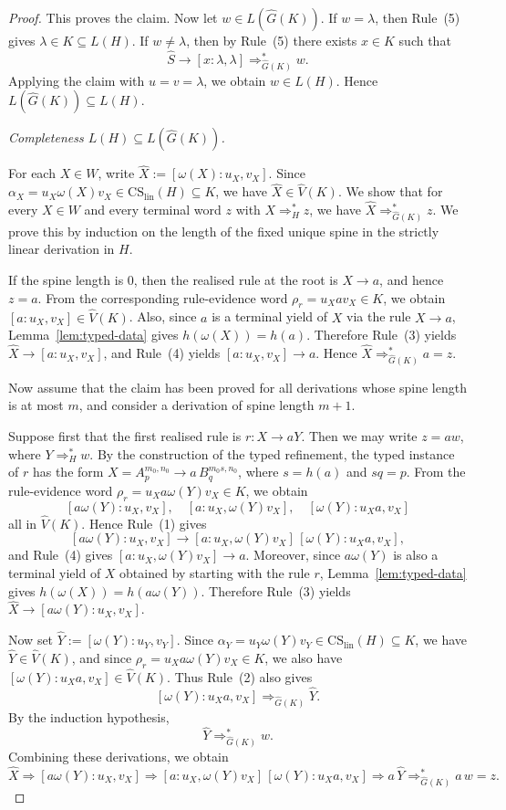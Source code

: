\documentclass[11pt,a4paper]{article}
\newcommand{\CS}{\mathrm{CS}}
\newcommand{\lin}{\mathrm{lin}}
\begin{document}
\begin{proof}
This proves the claim.
Now let $w\in L(\hat G(K))$.
If $w=\lambda$, then Rule~\textup{(5)} gives
$\lambda\in K\subseteq L(H)$.
If $w\neq\lambda$, then by Rule~\textup{(5)} there exists $x\in K$ such that
\[
\hat S\to[x:\lambda,\lambda]\Rightarrow_{\hat G(K)}^* w.
\]
Applying the claim with $u=v=\lambda$, we obtain $w\in L(H)$.
Hence $L(\hat G(K))\subseteq L(H)$.

\medskip
\noindent\emph{Completeness $L(H)\subseteq L(\hat G(K))$.}

For each $X\in W$, write $\widehat X:=[\omega(X):u_X,v_X]$.
Since $\alpha_X=u_X\omega(X)v_X\in \CS_{\lin}(H)\subseteq K$,
we have $\widehat X\in \hat V(K)$.
We show that for every $X\in W$ and every terminal word $z$ with
$X\Rightarrow_H^* z$, we have
$\widehat X\Rightarrow_{\hat G(K)}^* z$.
We prove this by induction on the length of the fixed unique spine in the
strictly linear derivation in $H$.

If the spine length is $0$, then the realised rule at the root is
$X\to a$, and hence $z=a$.
From the corresponding rule-evidence word $\rho_r=u_Xav_X\in K$,
we obtain $[a:u_X,v_X]\in \hat V(K)$.
Also, since $a$ is a terminal yield of $X$ via the rule $X\to a$,
Lemma~\ref{lem:typed-data} gives $h(\omega(X))=h(a)$.
Therefore Rule~\textup{(3)} yields
$\widehat X\to[a:u_X,v_X]$,
and Rule~\textup{(4)} yields
$[a:u_X,v_X]\to a$.
Hence $\widehat X\Rightarrow_{\hat G(K)}^* a=z$.

Now assume that the claim has been proved for all derivations whose spine
length is at most $m$, and consider a derivation of spine length $m+1$.

Suppose first that the first realised rule is $r:X\to aY$.
Then we may write $z=aw$, where $Y\Rightarrow_H^* w$.
By the construction of the typed refinement, the typed instance of $r$ has
the form
$X=A_p^{m_0,n_0}\to a\,B_q^{m_0s,n_0}$,
where $s=h(a)$ and $sq=p$.
From the rule-evidence word
$\rho_r=u_Xa\omega(Y)v_X\in K$, we obtain
\[
[a\omega(Y):u_X,v_X],\quad
[a:u_X,\omega(Y)v_X],\quad
[\omega(Y):u_Xa,v_X]
\]
all in $\hat V(K)$.
Hence Rule~\textup{(1)} gives
\[
[a\omega(Y):u_X,v_X]\to
[a:u_X,\omega(Y)v_X]\,[\omega(Y):u_Xa,v_X],
\]
and Rule~\textup{(4)} gives
$[a:u_X,\omega(Y)v_X]\to a$.
Moreover, since $a\omega(Y)$ is also a terminal yield of $X$ obtained by
starting with the rule $r$, Lemma~\ref{lem:typed-data} gives
$h(\omega(X))=h(a\omega(Y))$.
Therefore Rule~\textup{(3)} yields
$\widehat X\to[a\omega(Y):u_X,v_X]$.

Now set $\widehat Y:=[\omega(Y):u_Y,v_Y]$.
Since $\alpha_Y=u_Y\omega(Y)v_Y\in \CS_{\lin}(H)\subseteq K$,
we have $\widehat Y\in \hat V(K)$,
and since $\rho_r=u_Xa\omega(Y)v_X\in K$, we also have
$[\omega(Y):u_Xa,v_X]\in \hat V(K)$.
Thus Rule~\textup{(2)} also gives
\[
[\omega(Y):u_Xa,v_X]
\Rightarrow_{\hat G(K)}
\widehat Y .
\]
By the induction hypothesis,
\[
\widehat Y\Rightarrow_{\hat G(K)}^* w .
\]
Combining these derivations, we obtain
\[
\widehat X
\Rightarrow[a\omega(Y):u_X,v_X]
\Rightarrow[a:u_X,\omega(Y)v_X]\,[\omega(Y):u_Xa,v_X]
\Rightarrow a\,\widehat Y
\Rightarrow_{\hat G(K)}^* a\,w=z.
\]


\end{proof}
\end{document}
